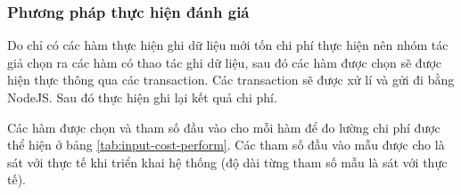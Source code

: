 \documentclass[../main-report.tex]{subfiles}
\begin{document}
\subsubsection{Phương pháp thực hiện đánh giá}
Do chỉ có các hàm thực hiện ghi dữ liệu mới tốn chi phí thực hiện nên nhóm tác giả chọn ra các hàm có thao tác ghi dữ liệu, sau đó các hàm được chọn sẽ được hiện thực thông qua các \gls{transaction}. Các \gls{transaction} sẽ được xử lí và gửi đi bằng NodeJS. Sau đó thực hiện ghi lại kết quả chi phí.

Các hàm được chọn và tham số đầu vào cho mỗi hàm để đo lường chi phí được thể hiện ở bảng \ref{tab:input-cost-perform}. Các tham số đầu vào mẫu được cho là sát với thực tế khi triển khai hệ thống (độ dài từng tham số mẫu là sát với thực tế).

\begin{table}[!ht]
\centering
{}
\end{table}
\end{document}
